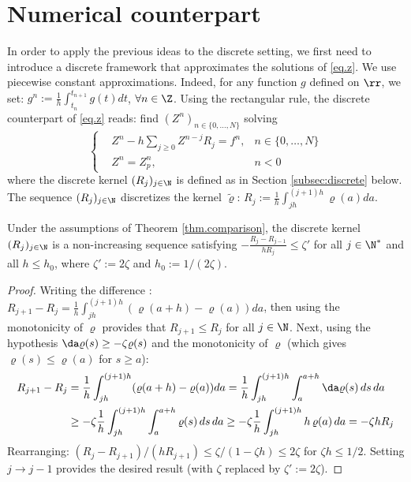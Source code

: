 \documentclass[]{jnsao}
\newcommand{\kernel}{\varrho}
\newcommand{\tkernel}{\tilde{\varrho}}
\renewcommand{\tr}{R}
\begin{document}
 \section{Numerical counterpart}\label{sec:discrete}
 In order to apply the previous ideas to the discrete setting, we first need to
 introduce a discrete framework that approximates the solutions of \eqref{eq.z}.
 We use piecewise constant approximations. Indeed, for any function $g$ defined on $\rr$, we set:
 $ g^n := \frac{1}{h} \int_{t_n}^{t_{n+1}} g(t) dt$,  $\forall n \in \Z$.
 Using the rectangular rule, the discrete counterpart of \eqref{eq.z} reads: find $(Z^n)_{n\in\{0, \ldots, N\}}$ solving 
 \begin{equation}\label{eq.disc.z}
 	\left\{\begin{aligned}
 		&	Z^n - h \sum_{j\geq 0} Z^{n-j} \tr_j = f^n , & n \in \{0, \ldots, N\} \\
 		&	Z^n = Z_p^n , & n<0
 	\end{aligned}\right.
 \end{equation}
 where the discrete kernel $(\tr_j)_{j\in\N}$ is defined as in Section \ref{subsec:discrete} below.		
The sequence $(\tr_j)_{j\in\N}$ discretizes the kernel $\tkernel$:
 $
 R_j := \frac{1}{h} \int_{jh}^{(j+1)h} \kernel(a) da %
 $.

\begin{lemma}
	Under the assumptions of Theorem \ref{thm.comparison}, the discrete kernel $(\tr_j)_{j\in\N}$ is a non-increasing sequence satisfying
	$ - \frac{\tr_j - \tr_{j-1}}{h \tr_j} \leq \zeta'$ for all $j \in \N^*$ and all $h \leq h_0$,
	where $\zeta' := 2\zeta$ and $h_0 := 1/(2\zeta)$.
\end{lemma}

\begin{proof}
	Writing the difference : $R_{j+1}-R_j = \frac{1}{h} \int_{jh}^{(j+1)h} (\kernel(a+h) - \kernel(a)) da$, 
	then using the monotonicity of $\kernel$ provides that $R_{j+1} \leq R_j$ for all $j\in\N$. 
	Next, using the hypothesis $\da \kernel(s) \geq -\zeta \kernel(s)$ and
	the monotonicity of $\kernel$ (which gives $\kernel(s) \leq \kernel(a)$ for $s\geq a$):
	\begin{align}
				R_{j+1}- R_{j} &= \frac{1}{h} \int_{jh}^{(j+1)h} (\kernel(a+h) - \kernel(a)) da
				= \frac{1}{h} \int_{jh}^{(j+1)h} \int_a^{a+h} \da \kernel(s)\, ds\, da \\
				&\geq - \zeta \frac{1}{h} \int_{jh}^{(j+1)h} \int_a^{a+h} \kernel(s)\, ds\, da
				\geq - \zeta \frac{1}{h} \int_{jh}^{(j+1)h} h\, \kernel(a)\, da
				= -\zeta h R_{j}
	\end{align}
	Rearranging: $(R_j - R_{j+1})/(h R_{j+1}) \leq \zeta/(1-\zeta h) \leq 2\zeta$ for $\zeta h \leq 1/2$.
	Setting $j \to j-1$ provides the desired result (with $\zeta$ replaced by $\zeta' := 2\zeta$).			
\end{proof}
\end{document}
